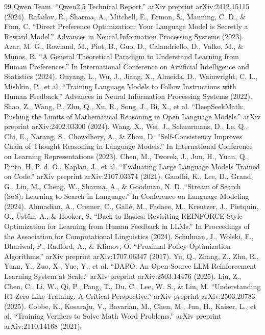 \documentclass[11pt]{article}
\begin{document}
\begin{thebibliography}{99}
 Qwen Team. ``Qwen2.5 Technical Report.'' arXiv preprint arXiv:2412.15115 (2024).
 Rafailov, R., Sharma, A., Mitchell, E., Ermon, S., Manning, C. D., \& Finn, C. ``Direct Preference
  Optimization: Your Language Model is Secretly a Reward Model.'' Advances in Neural Information Processing Systems (2023).
 Azar, M. G., Rowland, M., Piot, B., Guo, D., Calandriello, D., Valko, M., \& Munos, R. ``A General
  Theoretical Paradigm to Understand Learning from Human Preferences.'' In International Conference on Artificial
  Intelligence and Statistics (2024).
 Ouyang, L., Wu, J., Jiang, X., Almeida, D., Wainwright, C. L., Mishkin, P., et al. ``Training
  Language Models to Follow Instructions with Human Feedback.'' Advances in Neural Information Processing Systems (2022).
 Shao, Z., Wang, P., Zhu, Q., Xu, R., Song, J., Bi, X., et al. ``DeepSeekMath: Pushing the
  Limits of Mathematical Reasoning in Open Language Models.'' arXiv preprint arXiv:2402.03300 (2024).
 Wang, X., Wei, J., Schuurmans, D., Le, Q., Chi, E., Narang, S., Chowdhery, A., \& Zhou, D.
  ``Self-Consistency Improves Chain of Thought Reasoning in Language Models.'' In International Conference on
  Learning Representations (2023).
 Chen, M., Tworek, J., Jun, H., Yuan, Q., Pinto, H. P. d. O., Kaplan, J., et al. ``Evaluating Large
  Language Models Trained on Code.'' arXiv preprint arXiv:2107.03374 (2021).
 Gandhi, K., Lee, D., Grand, G., Liu, M., Cheng, W., Sharma, A., \& Goodman, N. D. ``Stream
  of Search (SoS): Learning to Search in Language.'' In Conference on Language Modeling (2024).
 Ahmadian, A., Cremer, C., Gall\'e, M., Fadaee, M., Kreutzer, J., Pietquin, O., \"Ust\"un, A., \&
  Hooker, S. ``Back to Basics: Revisiting REINFORCE-Style Optimization for Learning from Human Feedback in LLMs.''
  In Proceedings of the Association for Computational Linguistics (2024).
 Schulman, J., Wolski, F., Dhariwal, P., Radford, A., \& Klimov, O. ``Proximal Policy Optimization
  Algorithms.'' arXiv preprint arXiv:1707.06347 (2017).
 Yu, Q., Zhang, Z., Zhu, R., Yuan, Y., Zuo, X., Yue, Y., et al. ``DAPO: An Open-Source LLM
  Reinforcement Learning System at Scale.'' arXiv preprint arXiv:2503.14476 (2025).
 Liu, Z., Chen, C., Li, W., Qi, P., Pang, T., Du, C., Lee, W. S., \& Lin, M. ``Understanding
  R1-Zero-Like Training: A Critical Perspective.'' arXiv preprint arXiv:2503.20783 (2025).
 Cobbe, K., Kosaraju, V., Bavarian, M., Chen, M., Jun, H., Kaiser, L., et al. ``Training Verifiers
to Solve Math Word Problems.'' arXiv preprint arXiv:2110.14168 (2021).
\end{thebibliography}
\end{document}
